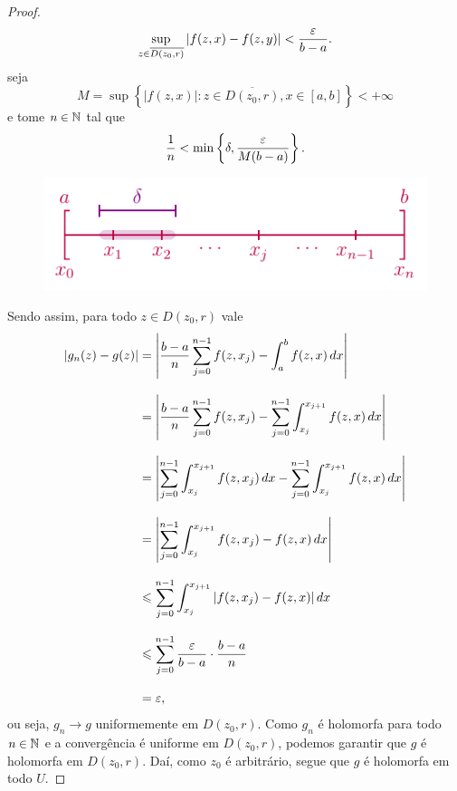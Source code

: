 \begin{proof}
%
\[
\sup_{z\in\overline{D(z_0,r)}} |f(z,x) - f(z,y)| < \frac{\varepsilon}{b-a}.
\]
%
seja
%
\[
M = \sup\left\{ |f(z,x)| : z\in\overline{D(z_0,r)}, x\in[a,b] \right\} < +\infty
\]
%
e tome $n\in\mathbb{N}$ tal que
%
\[
\frac{1}{n} < \min\left\{ \delta, \frac{\varepsilon}{M(b-a)} \right\}.
\]
%
\begin{figure}[H]\centering
    \includegraphics{Figuras/partição delta.pdf}
\end{figure}
%
Sendo assim, para todo $z\in D(z_0, r)$ vale
%
\begin{align*}
    |g_n(z) - g(z)| &= \left| \frac{b-a}{n}\sum_{j=0}^{n-1} f(z,x_j) 
                    - \int_a^b f(z,x) \, dx \right| \\[0.3cm]
                    &= \left| \frac{b-a}{n}\sum_{j=0}^{n-1} f(z,x_j) 
                    - \sum_{j=0}^{n-1}\int_{x_j}^{x_{j+1}} f(z,x) \, dx \right| \\[0.3cm]
                    &= \left| \sum_{j=0}^{n-1}\int_{x_j}^{x_{j+1}} f(z,x_j) \, dx
                    - \sum_{j=0}^{n-1}\int_{x_j}^{x_{j+1}} f(z,x) \, dx \right| \\[0.3cm]
                    &= \left| \sum_{j=0}^{n-1}\int_{x_j}^{x_{j+1}} f(z,x_j) - f(z,x) \, dx 
                    \right| \\[0.3cm]
                    &\leqslant \sum_{j=0}^{n-1}\int_{x_j}^{x_{j+1}} |f(z,x_j) - f(z,x)| \, dx \\[0.3cm]
                    &\leqslant \sum_{j=0}^{n-1} \frac{\varepsilon}{b-a}\cdot\frac{b-a}{n} \\[0.3cm]
                    &= \varepsilon,
\end{align*}
%
ou seja, $g_n\to g$ uniformemente em $D(z_0,r)$. Como $g_n$ é holomorfa para todo $n\in\mathbb{N}$
e a convergência é uniforme em $D(z_0,r)$, podemos garantir que $g$ é holomorfa em $D(z_0,r)$.
Daí, como $z_0$ é arbitrário, segue que $g$ é holomorfa em todo $U$.
\end{proof}
%
